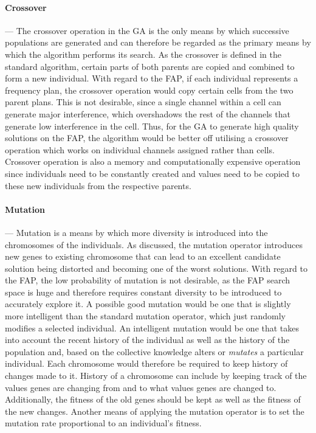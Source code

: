 \paragraph{Crossover}
--- The crossover operation in the \gls{GA} is the only means by which successive populations are generated and can therefore be regarded as the primary means by which the algorithm performs its search. As the crossover is defined in the standard algorithm, certain parts of both parents are copied and combined to form a new individual. With regard to the \gls{FAP}, if each individual represents a frequency plan, the crossover operation would copy certain cells from the two parent plans. This is not desirable, since a single channel within a cell can generate major interference, which overshadows the rest of the channels that generate low interference in the cell. Thus, for the \gls{GA} to generate high quality solutions on the \gls{FAP}, the algorithm would be better off utilising a crossover operation which works on individual channels assigned rather than cells. Crossover operation is also a memory and computationally expensive operation since individuals need to be constantly created and values need to be copied to these new individuals from the respective parents.
\paragraph{Mutation}
--- Mutation is a means by which more diversity is introduced into the chromosomes of the individuals.  As discussed, the mutation operator introduces new genes to existing chromosome that can lead to an excellent candidate solution being distorted and becoming one of the worst solutions. With regard to the \gls{FAP}, the low probability of mutation is not desirable, as the \gls{FAP} search space is huge and therefore requires constant diversity to be introduced to accurately explore it. A possible good mutation would be one that is slightly more intelligent than the standard mutation operator, which just randomly modifies a selected individual. An intelligent mutation would be one that takes into account the recent history of the individual as well as the history of the population and, based on the collective knowledge alters or \emph{mutates} a particular individual. Each chromosome would therefore be required to keep history of changes made to it. History of a chromosome can include by keeping track of the values genes are changing from and to what values genes are changed to. Additionally, the fitness of the old genes should be kept as well as the fitness of the new changes. Another means of applying the mutation operator is to set the mutation rate proportional to an individual's fitness.
